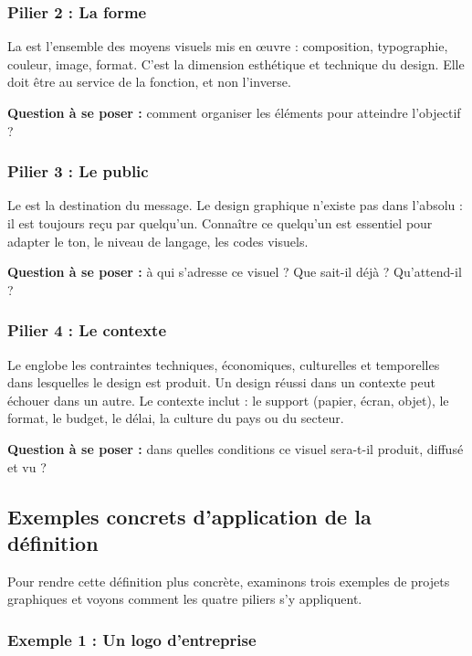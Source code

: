 \subsubsection{Pilier 2 : La forme}

La  est l'ensemble des moyens visuels mis en œuvre : composition, typographie, couleur, image, format. C'est la dimension esthétique et technique du design. Elle doit être au service de la fonction, et non l'inverse.

\textbf{Question à se poser :} comment organiser les éléments pour atteindre l'objectif ?

\subsubsection{Pilier 3 : Le public}

Le  est la destination du message. Le design graphique n'existe pas dans l'absolu : il est toujours reçu par quelqu'un. Connaître ce quelqu'un est essentiel pour adapter le ton, le niveau de langage, les codes visuels.

\textbf{Question à se poser :} à qui s'adresse ce visuel ? Que sait-il déjà ? Qu'attend-il ?

\subsubsection{Pilier 4 : Le contexte}

Le  englobe les contraintes techniques, économiques, culturelles et temporelles dans lesquelles le design est produit. Un design réussi dans un contexte peut échouer dans un autre. Le contexte inclut : le support (papier, écran, objet), le format, le budget, le délai, la culture du pays ou du secteur.

\textbf{Question à se poser :} dans quelles conditions ce visuel sera-t-il produit, diffusé et vu ?

\subsection{Exemples concrets d'application de la définition}

Pour rendre cette définition plus concrète, examinons trois exemples de projets graphiques et voyons comment les quatre piliers s'y appliquent.

\subsubsection{Exemple 1 : Un logo d'entreprise}

